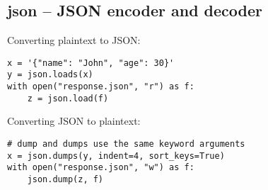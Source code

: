 \subsection{json -- JSON encoder and decoder}
Converting plaintext to JSON:
\begin{verbatim}
x = '{"name": "John", "age": 30}'
y = json.loads(x)
with open("response.json", "r") as f:
    z = json.load(f)
\end{verbatim}

Converting JSON to plaintext:
\begin{verbatim}
# dump and dumps use the same keyword arguments
x = json.dumps(y, indent=4, sort_keys=True)
with open("response.json", "w") as f:
    json.dump(z, f)
\end{verbatim}
